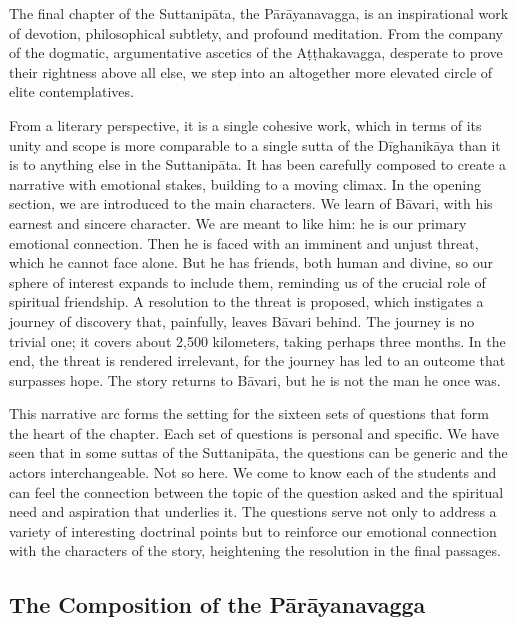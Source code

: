 \documentclass[12pt,openany]{book}%
\begin{document}
The final chapter of the \textsanskrit{Suttanipāta}, the \textsanskrit{Pārāyanavagga}, is an inspirational work of devotion, philosophical subtlety, and profound meditation. From the company of the dogmatic, argumentative ascetics of the \textsanskrit{Aṭṭhakavagga}, desperate to prove their rightness above all else, we step into an altogether more elevated circle of elite contemplatives.

From a literary perspective, it is a single cohesive work, which in terms of its unity and scope is more comparable to a single sutta of the \textsanskrit{Dīghanikāya} than it is to anything else in the \textsanskrit{Suttanipāta}. It has been carefully composed to create a narrative with emotional stakes, building to a moving climax. In the opening section, we are introduced to the main characters. We learn of \textsanskrit{Bāvari}, with his earnest and sincere character. We are meant to like him: he is our primary emotional connection. Then he is faced with an imminent and unjust threat, which he cannot face alone. But he has friends, both human and divine, so our sphere of interest expands to include them, reminding us of the crucial role of spiritual friendship. A resolution to the threat is proposed, which instigates a journey of discovery that, painfully, leaves \textsanskrit{Bāvari} behind. The journey is no trivial one; it covers about 2,500 kilometers, taking perhaps three months. In the end, the threat is rendered irrelevant, for the journey has led to an outcome that surpasses hope. The story returns to \textsanskrit{Bāvari}, but he is not the man he once was.

This narrative arc forms the setting for the sixteen sets of questions that form the heart of the chapter. Each set of questions is personal and specific. We have seen that in some suttas of the \textsanskrit{Suttanipāta}, the questions can be generic and the actors interchangeable. Not so here. We come to know each of the students and can feel the connection between the topic of the question asked and the spiritual need and aspiration that underlies it. The questions serve not only to address a variety of interesting doctrinal points but to reinforce our emotional connection with the characters of the story, heightening the resolution in the final passages.

\subsection*{The Composition of the \textsanskrit{Pārāyanavagga}}
\end{document}
